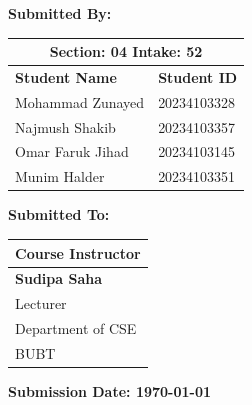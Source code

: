 \documentclass[12pt,a4paper]{report}
\begin{document}
\begin{titlepage}
\begin{center}
        \begin{table}[H]
            \centering
            \begin{minipage}[t]{0.55\textwidth}
                \textbf{\Large Submitted By:}\\[0.2cm]
                \large
                \begin{tabular}{|l|l|}
                    \hline
                    \multicolumn{2}{|c|}{\textbf{Section:} 04 \quad \textbf{Intake:} 52} \\ \hline
                    \textbf{Student Name} & \textbf{Student ID} \\ \hline
                    Mohammad Zunayed & 20234103328 \\ \hline
                    Najmush Shakib & 20234103357 \\ \hline
                    Omar Faruk Jihad & 20234103145 \\ \hline
                    Munim Halder & 20234103351 \\ \hline
                \end{tabular}
            \end{minipage}
            \hfill
            \begin{minipage}[t]{0.4\textwidth}
                \textbf{\Large Submitted To:}\\[0.2cm]
                \large
                \begin{tabular}{|l|}
                    \hline
                    \multicolumn{1}{|c|}{\textbf{Course Instructor}} \\ \hline
                    \textbf{Sudipa Saha} \\ \hline
                    Lecturer \\ \hline
                    Department of CSE \\ \hline
                    BUBT \\ \hline
                \end{tabular}
            \end{minipage}
        \end{table}
        
        \vfill
        
        {\Large \textbf{Submission Date: \today}}
        
    \end{center}
\end{titlepage}

\onehalfspacing

\tableofcontents
\newpage
\listoftables
\newpage
{}
\end{document}
